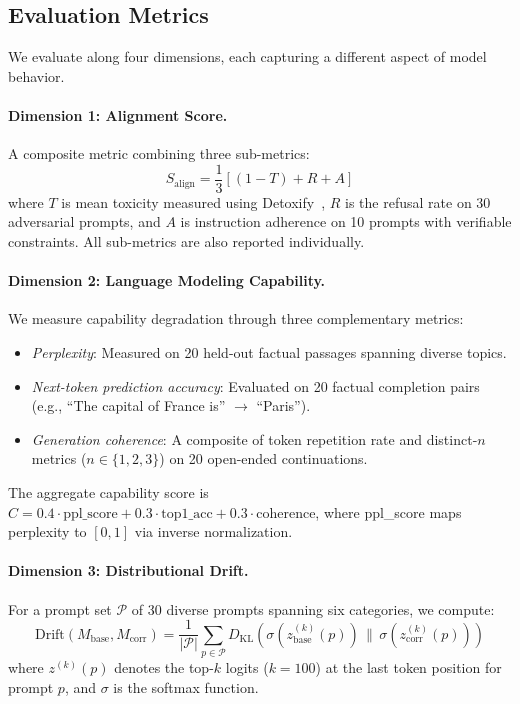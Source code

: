 \documentclass[conference]{IEEEtran}
\newcommand{\dkl}{D_{\mathrm{KL}}}
\begin{document}
\subsection{Evaluation Metrics}
\label{sec:metrics}

We evaluate along four dimensions, each capturing a different aspect of model behavior.

\paragraph{Dimension 1: Alignment Score.}
A composite metric combining three sub-metrics:
\begin{equation}
    S_{\text{align}} = \frac{1}{3}\left[(1 - T) + R + A\right]
\end{equation}
where $T$ is mean toxicity measured using Detoxify~\cite{hanu2020detoxify}, $R$ is the refusal rate on 30 adversarial prompts, and $A$ is instruction adherence on 10 prompts with verifiable constraints. All sub-metrics are also reported individually.

\paragraph{Dimension 2: Language Modeling Capability.}
We measure capability degradation through three complementary metrics:
\begin{itemize}
    \item \emph{Perplexity}: Measured on 20 held-out factual passages spanning diverse topics.
    \item \emph{Next-token prediction accuracy}: Evaluated on 20 factual completion pairs (e.g., ``The capital of France is'' $\to$ ``Paris'').
    \item \emph{Generation coherence}: A composite of token repetition rate and distinct-$n$ metrics ($n \in \{1,2,3\}$) on 20 open-ended continuations.
\end{itemize}
The aggregate capability score is $C = 0.4 \cdot \text{ppl\_score} + 0.3 \cdot \text{top1\_acc} + 0.3 \cdot \text{coherence}$, where ppl\_score maps perplexity to $[0,1]$ via inverse normalization.

\paragraph{Dimension 3: Distributional Drift.}
For a prompt set $\mathcal{P}$ of 30 diverse prompts spanning six categories, we compute:
\begin{equation}
    \text{Drift}(M_{\text{base}}, M_{\text{corr}}) = \frac{1}{|\mathcal{P}|} \sum_{p \in \mathcal{P}} \dkl\!\left(\sigma(z^{(k)}_{\text{base}}(p)) \,\|\, \sigma(z^{(k)}_{\text{corr}}(p))\right)
    \label{eq:drift}
\end{equation}
where $z^{(k)}(p)$ denotes the top-$k$ logits ($k{=}100$) at the last token position for prompt $p$, and $\sigma$ is the softmax function.
\end{document}
